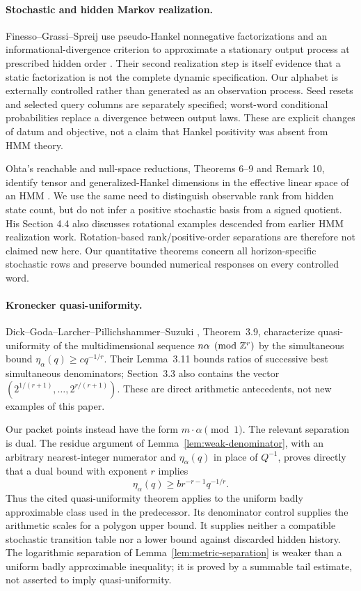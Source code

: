 \paragraph{Stochastic and hidden Markov realization.}
Finesso--Grassi--Spreij use pseudo-Hankel nonnegative factorizations and
an informational-divergence criterion to approximate a stationary
output process at prescribed hidden order \cite[Sections III--IV]{FGS10}.
Their second realization step is itself evidence that a static
factorization is not the complete dynamic specification. Our alphabet
is externally controlled rather than generated as an observation
process. Seed resets and selected query columns are separately specified;
worst-word conditional probabilities replace a divergence between
output laws. These are explicit changes of datum and objective, not
a claim that Hankel positivity was absent from HMM theory.

Ohta's reachable and null-space reductions, Theorems 6--9 and Remark 10,
identify tensor and generalized-Hankel dimensions in the effective
linear space of an HMM \cite{Ohta20}. We use the same need to distinguish
observable rank from hidden state count, but do not infer a positive
stochastic basis from a signed quotient. His Section 4.4 also discusses
rotational examples descended from earlier HMM realization work.
Rotation-based rank/positive-order separations are therefore not claimed
new here. Our quantitative theorems concern all horizon-specific
stochastic rows and preserve bounded numerical responses on every
controlled word.

\paragraph{Kronecker quasi-uniformity.}
Dick--Goda--Larcher--Pillichshammer--Suzuki \cite{DGLPS}, Theorem~3.9, characterize quasi-uniformity of the multidimensional sequence $n\alpha\pmod{\mathbb Z^r}$ by the simultaneous bound $\eta_\alpha(q)\ge c q^{-1/r}$. Their Lemma~3.11 bounds ratios of successive best simultaneous denominators; Section~3.3 also contains the vector $(2^{1/(r+1)},\ldots,2^{r/(r+1)})$. These are direct arithmetic antecedents, not new examples of this paper.

Our packet points instead have the form $m\cdot\alpha\pmod1$. The relevant separation is dual. The residue argument of Lemma~\ref{lem:weak-denominator}, with an arbitrary nearest-integer numerator and $\eta_\alpha(q)$ in place of $Q^{-1}$, proves directly that a dual bound with exponent $r$ implies
\[
             \eta_\alpha(q)\ge b r^{-r-1}q^{-1/r}.
\]
Thus the cited quasi-uniformity theorem applies to the uniform badly approximable class used in the predecessor. Its denominator control supplies the arithmetic scales for a polygon upper bound. It supplies neither a compatible stochastic transition table nor a lower bound against discarded hidden history. The logarithmic separation of Lemma~\ref{lem:metric-separation} is weaker than a uniform badly approximable inequality; it is proved by a summable tail estimate, not asserted to imply quasi-uniformity.

